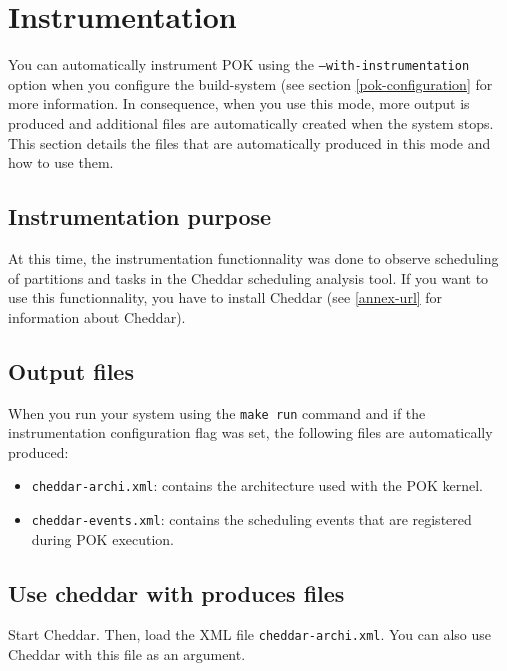 %
% 
%
%
%
%
%


\chapter{Instrumentation}
\label{chapter-instrumentation}
You can automatically instrument POK using the \texttt{--with-instrumentation} option when 
you configure the build-system (see section \ref{pok-configuration} for more information.
In consequence, when you use this mode, more output is produced and additional files are automatically created when
the system stops. This section details the files that are automatically produced in this mode and how to use them.

   \section{Instrumentation purpose}
   At this time, the instrumentation functionnality was done to observe scheduling of partitions and tasks
   in the Cheddar scheduling analysis tool. If you want to use this functionnality, you have to install Cheddar (see \ref{annex-url}
   for information about Cheddar).

   \section{Output files}
   When you run your system using the \texttt{make run} command and if the instrumentation configuration flag was set, the following files are
   automatically produced:
   \begin{itemize}
      \item
         \texttt{cheddar-archi.xml}: contains the architecture used with the POK kernel.
      \item
         \texttt{cheddar-events.xml}: contains the scheduling events that are registered during POK execution.
   \end{itemize}

   \section{Use cheddar with produces files}
   Start Cheddar. Then, load the XML file \texttt{cheddar-archi.xml}. You can also use Cheddar with this file as an argument.


